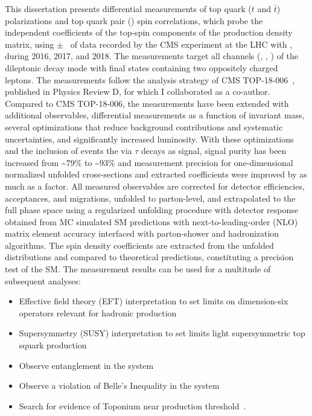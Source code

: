 \begin{refsection}
This dissertation presents differential measurements of top quark ($t$ and $\bar{t}$) polarizations and top quark pair (\ttbar) spin correlations, which probe the independent coefficients of the top-spin components of the \ttbar production density matrix, using \lumivalueRuniiUL $\pm$ \lumierrRuniiUL\ of data recorded by the CMS experiment at the LHC with \beamenergy, during 2016, 2017, and 2018.
The measurements target all channels (\ee, \emu, \mumu) of the \ttbar dileptonic decay mode with final states containing two oppositely charged leptons.
The measurements follow the analysis strategy of CMS TOP-18-006~\cite{Sirunyan:2681777}, published in Physics Review D, for which I collaborated as a co-author.
Compared to CMS TOP-18-006, the measurements have been extended with additional observables, differential measurements as a function of \ttbar invariant mass, several optimizations that reduce background contributions and systematic uncertainties, and significantly increased luminosity.
With these optimizations and the inclusion of \ttbar events the via $\tau$ decays as signal, signal purity has been increased from \sim$79\%$ to \sim$93\%$ and measurement precision for one-dimensional normalized unfolded cross-sections and extracted coefficients were improved by as much as a factor.
All measured observables are corrected for detector efficiencies, acceptances, and migrations, unfolded to parton-level, and extrapolated to the full phase space using a regularized unfolding procedure with detector response obtained from MC simulated SM predictions with next-to-leading-order (NLO) matrix element accuracy interfaced with parton-shower and hadronization algorithms.
The spin density coefficients are extracted from the unfolded distributions and compared to theoretical predictions, constituting a precision test of the SM.
The measurement results can be used for a multitude of subsequent analyses:
\begin{itemize}
    \item Effective field theory (EFT) interpretation to set limits on dimension-six operators relevant for hadronic \ttbar production~\cite{Sirunyan:2681777}
    \item Supersymmetry (SUSY) interpretation to set limits light supersymmetric top squark production~\cite{CMS-PAS-FTR-18-034}
    \item Observe entanglement in the \ttbar system~\cite{Afik_2021}
    \item Observe a violation of Belle's Inequality in the \ttbar system~\cite{Aguilar_Saavedra_2022}
    \item Search for evidence of Toponium near \ttbar production threshold~\cite{PhysRevD.104.034023}.
\end{itemize}


\end{refsection}
